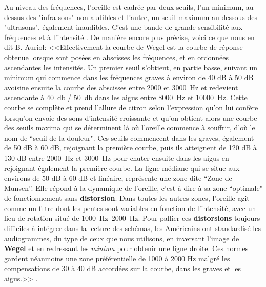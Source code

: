 Au niveau des fréquences, l'oreille est cadrée par deux seuils,  l'un minimum, au-dessus des 
"infra-sons" non audibles et l'autre, un seuil maximum au-dessous des "ultrasons", également 
inaudibles. C'est une bande de grande sensibilité aux fréquences et à l'intensité 
\autocite{Tomatislangage}. De manière encore plus précise, voici ce que nous en dit B. Auriol:
<<Effectivement la courbe de Wegel est la courbe de réponse obtenue
lorsque sont posées en abscisses les fréquences, et en ordonnées ascendantes
les intensités. Un premier seuil s'obtient, en partie basse, suivant
un minimum qui commence dans les fréquences graves à environ de 40 dB à 50 dB
 avoisine ensuite la courbe des abscisses entre 2000 et \SI{3000}{\Hz}
et redevient ascendante à \SI{40}{\decibel} / \SI{50}{\decibel} dans les aigus entre \SI{8000}{\Hz} et
\SI{10000}{\Hz}. Cette courbe se complète et prend l'allure de citron selon
l'expression qu'on lui confère lorsqu'on envoie des
sons d'intensité croissante et qu'on obtient alors une courbe des
seuils maxima qui se déterminent là où l'oreille commence à souffrir,
d'où le nom de ``seuil de la douleur". Ces seuils
commencent dans les graves, également de 50 dB à 60 dB, rejoignant la première
courbe, puis ils atteignent de 120 dB à 130 dB entre \SI{2000}{\Hz} et \SI{3000}{\Hz} pour
chuter ensuite dans les aigus en rejoignant également la première
courbe. La ligne médiane qui se situe aux environs de 50 dB à 60 dB et linéaire, représente une zone dite 
``Zone de Munsen''. Elle répond à la dynamique de l'oreille, c'est-à-dire
à sa zone ``optimale" de fonctionnement sans
\textbf{distorsion}.
Dans toutes les autres zones, l'oreille
agit comme un filtre dont les pentes sont variables en fonction de
l'intensité, avec un lieu de rotation situé de \SIrange{1000}{2000}{\Hz}.
Pour pallier ces \textbf{distorsions} toujours difficiles à intégrer
dans la lecture des schémas, les Américains ont standardisé les audiogrammes,
du type de ceux que nous utilisons, en inversant l'image
de \textbf{Wegel} et en redressant les \emph{minima} pour obtenir une ligne droite.
Ces normes gardent néanmoins une zone préférentielle de 1000 à 2000 Hz malgré les compensations de 30 à 40 dB accordées sur la courbe,
dans les graves et les aigus.>>
\autocite{auriol_stress}.


